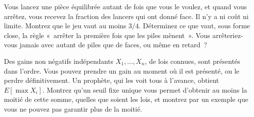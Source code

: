 \begin{question}\label{iq:iv1:optimal-stopping:19}
Vous lancez une pièce équilibrée autant de fois que vous le voulez, et quand vous arrêtez, vous recevez la fraction des lancers qui ont donné face. Il n'y a ni coût ni limite. Montrez que le jeu vaut au moins $3/4$. Déterminez ce que vaut, sous forme close, la règle «~arrêter la première fois que les piles mènent~». Vous arrêteriez-vous jamais avec autant de piles que de faces, ou même en retard~?
\end{question}

\begin{question}\label{iq:iv1:optimal-stopping:20}
Des gains non négatifs indépendants $X_1, \dots, X_n$, de lois connues, sont présentés dans l'ordre. Vous pouvez prendre un gain au moment où il est présenté, ou le perdre définitivement. Un prophète, qui les voit tous à l'avance, obtient $E[\max X_i]$. Montrez qu'un seuil fixe unique vous permet d'obtenir au moins la moitié de cette somme, quelles que soient les lois, et montrez par un exemple que vous ne pouvez pas garantir plus de la moitié.
\end{question}
